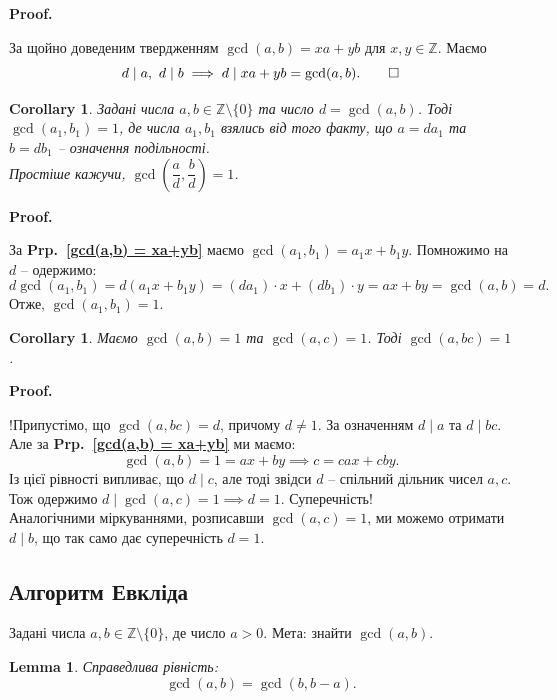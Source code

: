 \documentclass[a4paper, 10pt]{article}
\makeatletter
\theoremstyle{theoremdd}
\theoremstyle{theoremdd}
\theoremstyle{theoremdd}
\theoremstyle{theoremdd}
\theoremstyle{theoremdd}
\theoremstyle{theoremdd}
\theoremstyle{theoremdd}
\newtheorem{lemma}[theorem]{Lemma}
\theoremstyle{theoremdd}
\newtheorem{corollary}[theorem]{Corollary}
\renewenvironment{proof}[1][Proof.\\]{\par
\pushQED{\hfill \qed}%
\normalfont \topsep6\p@\@plus6\p@\relax
\trivlist
\item\relax
{\bfseries
#1\@addpunct{.}}\hspace\labelsep\ignorespaces
}{%
\popQED\endtrivlist\@endpefalse
}
\newcommand\prpref[1]{\textbf{Prp.~\ref{#1}}}
\makeatother
\begin{document}
\begin{proof}
За щойно доведеним твердженням $\gcd(a,b) = xa + yb$ для $x,y \in \mathbb{Z}$. Маємо
\[
d \mid a,\ d \mid b \implies d \mid xa + yb = \gcd(a,b). \qedhere
\]
\end{proof}

\begin{corollary}
Задані числа $a,b \in \mathbb{Z} \setminus \{0\}$ та число $d = \gcd(a,b)$.
Тоді $\gcd(a_1,b_1) = 1$, де числа $a_1,b_1$ взялись від того факту, що $a = da_1$ та $b = db_1$ -- означення подільності. \\
Простіше кажучи, $\gcd\left( \dfrac{a}{d}, \dfrac{b}{d} \right) = 1$.
\end{corollary}

\begin{proof}
За \prpref{gcd(a,b) = xa+yb} маємо $\gcd (a_1,b_1) = a_1 x + b_1 y$. Помножимо на $d$ -- одержимо:
\[
d \gcd (a_1,b_1) = d(a_1x+b_1y) = (da_1) \cdot x + (db_1) \cdot y = ax + by = \gcd (a,b) = d.
\]
Отже, $\gcd(a_1,b_1) = 1$.
\end{proof}

\begin{corollary}
Маємо $\gcd(a,b) = 1$ та $\gcd(a,c) = 1$. Тоді $\gcd(a,bc) = 1$.
\end{corollary}

\begin{proof}
!Припустімо, що $\gcd(a,bc) = d$, причому $d \neq 1$. За означенням $d \mid a$ та $d \mid bc$. Але за \prpref{gcd(a,b) = xa+yb} ми маємо:
\[
\gcd(a,b) = 1 = ax + by \implies c = cax + cby.
\]
Із цієї рівності випливає, що $d \mid c$, але тоді звідси $d$ -- спільний дільник чисел $a,c$. Тож одержимо $d \mid \gcd(a,c) = 1 \implies d = 1$. Суперечність!\\
Аналогічними міркуваннями, розписавши $\gcd(a,c) = 1$, ми можемо отримати $d \mid b$, що так само дає суперечність $d = 1$.
\end{proof}

\subsection{Алгоритм Евкліда}
Задані числа $a,b \in \mathbb{Z} \setminus \{0\}$, де число $a > 0$. Мета: знайти $\gcd(a,b)$.

\begin{lemma}
Справедлива рівність:
\begin{equation}
\gcd(a,b) = \gcd(b, b-a).
\end{equation}
\end{lemma}
\end{document}
